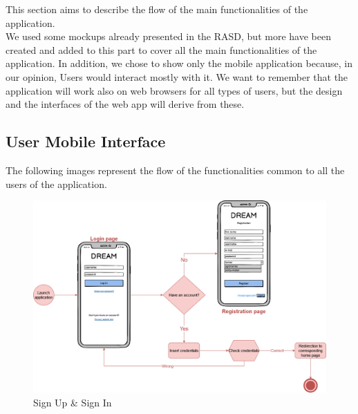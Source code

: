 This section aims to describe the flow of the main functionalities of the application.\\
We used some mockups already presented in the RASD, but more have been created and added to
this part to cover all the main functionalities of the application. In addition, we chose
to show only the mobile application because, in our opinion, Users would interact mostly with it.
We want to remember that the application will work also on web browsers for all types of users,
but the design and the interfaces of the web app will derive from these.
\\
\bigskip
\subsection{User Mobile Interface}
The following images represent the flow of the functionalities common to all the users of the application.\\
\begin{center}
    \begin{figure}[H]
        \includegraphics[width=\textwidth]{Images/UserInterface/Diagram/login.drawio.png}
        \caption{Sign Up \& Sign In}
    \end{figure}
\end{center}
\newpage

